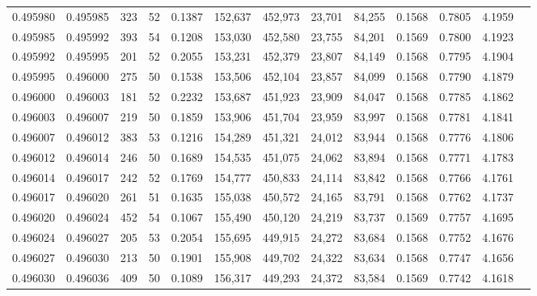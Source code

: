 \begin{tabular}{rrrrrrrrrrrrr}
0.495980 & 0.495985 & 323 &  52 &                                     0.1387 & 152,637 & 452,973 &  23,701 &  84,255 & 0.1568 & 0.7805 & 4.1959 \\
0.495985 & 0.495992 & 393 &  54 &                                     0.1208 & 153,030 & 452,580 &  23,755 &  84,201 & 0.1569 & 0.7800 & 4.1923 \\
0.495992 & 0.495995 & 201 &  52 &                                     0.2055 & 153,231 & 452,379 &  23,807 &  84,149 & 0.1568 & 0.7795 & 4.1904 \\
0.495995 & 0.496000 & 275 &  50 &                                     0.1538 & 153,506 & 452,104 &  23,857 &  84,099 & 0.1568 & 0.7790 & 4.1879 \\
0.496000 & 0.496003 & 181 &  52 &                                     0.2232 & 153,687 & 451,923 &  23,909 &  84,047 & 0.1568 & 0.7785 & 4.1862 \\
0.496003 & 0.496007 & 219 &  50 &                                     0.1859 & 153,906 & 451,704 &  23,959 &  83,997 & 0.1568 & 0.7781 & 4.1841 \\
0.496007 & 0.496012 & 383 &  53 &                                     0.1216 & 154,289 & 451,321 &  24,012 &  83,944 & 0.1568 & 0.7776 & 4.1806 \\
0.496012 & 0.496014 & 246 &  50 &                                     0.1689 & 154,535 & 451,075 &  24,062 &  83,894 & 0.1568 & 0.7771 & 4.1783 \\
0.496014 & 0.496017 & 242 &  52 &                                     0.1769 & 154,777 & 450,833 &  24,114 &  83,842 & 0.1568 & 0.7766 & 4.1761 \\
0.496017 & 0.496020 & 261 &  51 &                                     0.1635 & 155,038 & 450,572 &  24,165 &  83,791 & 0.1568 & 0.7762 & 4.1737 \\
0.496020 & 0.496024 & 452 &  54 &                                     0.1067 & 155,490 & 450,120 &  24,219 &  83,737 & 0.1569 & 0.7757 & 4.1695 \\
0.496024 & 0.496027 & 205 &  53 &                                     0.2054 & 155,695 & 449,915 &  24,272 &  83,684 & 0.1568 & 0.7752 & 4.1676 \\
0.496027 & 0.496030 & 213 &  50 &                                     0.1901 & 155,908 & 449,702 &  24,322 &  83,634 & 0.1568 & 0.7747 & 4.1656 \\
0.496030 & 0.496036 & 409 &  50 &                                     0.1089 & 156,317 & 449,293 &  24,372 &  83,584 & 0.1569 & 0.7742 & 4.1618 \\

\end{tabular}
